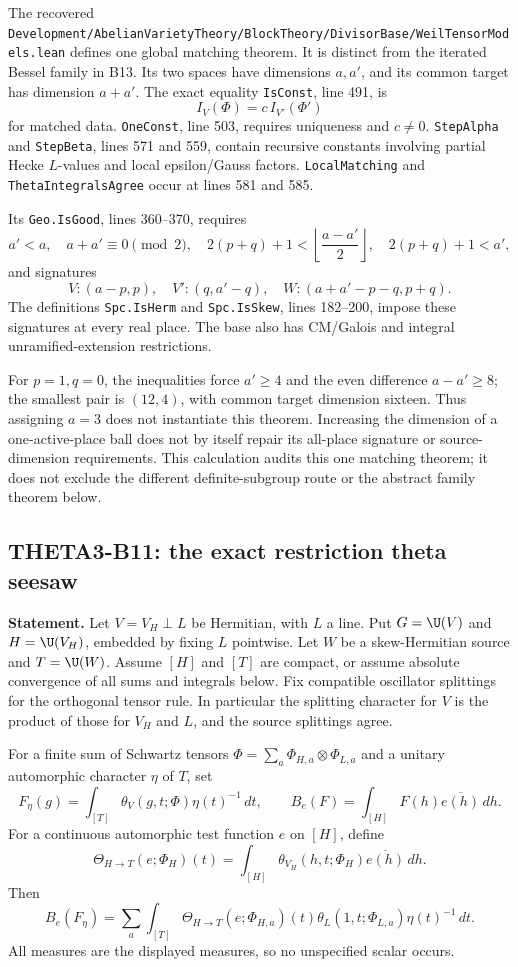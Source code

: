 The recovered \texttt{Development/AbelianVarietyTheory/BlockTheory/DivisorBase/WeilTensorModels.lean} defines one global matching theorem. It is distinct from the iterated Bessel family in B13. Its two spaces have dimensions $a,a'$, and its common target has dimension $a+a'$. The exact equality \texttt{IsConst}, line 491, is
\[
 I_V(\Phi)=c\,I_{V'}(\Phi')
\]
for matched data. \texttt{OneConst}, line 503, requires uniqueness and $c\ne0$. \texttt{StepAlpha} and \texttt{StepBeta}, lines 571 and 559, contain recursive constants involving partial Hecke $L$-values and local epsilon/Gauss factors. \texttt{LocalMatching} and \texttt{ThetaIntegralsAgree} occur at lines 581 and 585.

Its \texttt{Geo.IsGood}, lines 360--370, requires
\[
 a'<a,\quad a+a'\equiv0\pmod2,\quad
 2(p+q)+1<\left\lfloor\frac{a-a'}2\right\rfloor,\quad
 2(p+q)+1<a',
\]
and signatures
\[
 V:(a-p,p),\quad V':(q,a'-q),\quad
 W:(a+a'-p-q,p+q).
\]
The definitions \texttt{Spc.IsHerm} and \texttt{Spc.IsSkew}, lines 182--200, impose these signatures at every real place. The base also has CM/Galois and integral unramified-extension restrictions.

For $p=1,q=0$, the inequalities force $a'\geq4$ and the even difference $a-a'\geq8$; the smallest pair is $(12,4)$, with common target dimension sixteen. Thus assigning $a=3$ does not instantiate this theorem. Increasing the dimension of a one-active-place ball does not by itself repair its all-place signature or source-dimension requirements. This calculation audits this one matching theorem; it does not exclude the different definite-subgroup route or the abstract family theorem below.

\subsection{THETA3-B11: the exact restriction theta seesaw}\label{B11}

\textbf{Statement.} Let $V=V_H\perp L$ be Hermitian, with $L$ a line. Put $G=\U(V)$ and $H=\U(V_H)$, embedded by fixing $L$ pointwise. Let $W$ be a skew-Hermitian source and $T=\U(W)$. Assume $[H]$ and $[T]$ are compact, or assume absolute convergence of all sums and integrals below. Fix compatible oscillator splittings for the orthogonal tensor rule. In particular the splitting character for $V$ is the product of those for $V_H$ and $L$, and the source splittings agree.

For a finite sum of Schwartz tensors
$\Phi=\sum_a\Phi_{H,a}\otimes\Phi_{L,a}$ and a unitary automorphic character $\eta$ of $T$, set
\[
 F_\eta(g)=\int_{[T]}\theta_V(g,t;\Phi)\eta(t)^{-1}\,dt,
 \qquad
 B_e(F)=\int_{[H]}F(h)\overline{e(h)}\,dh.
\]
For a continuous automorphic test function $e$ on $[H]$, define
\[
 \Theta_{H\to T}(e;\Phi_H)(t)=
 \int_{[H]}\theta_{V_H}(h,t;\Phi_H)\overline{e(h)}\,dh.
\]
Then
\[
 B_e(F_\eta)=\sum_a\int_{[T]}
 \Theta_{H\to T}(e;\Phi_{H,a})(t)
 \theta_L(1,t;\Phi_{L,a})\eta(t)^{-1}\,dt.
 \tag{B11}
\]
All measures are the displayed measures, so no unspecified scalar occurs.

